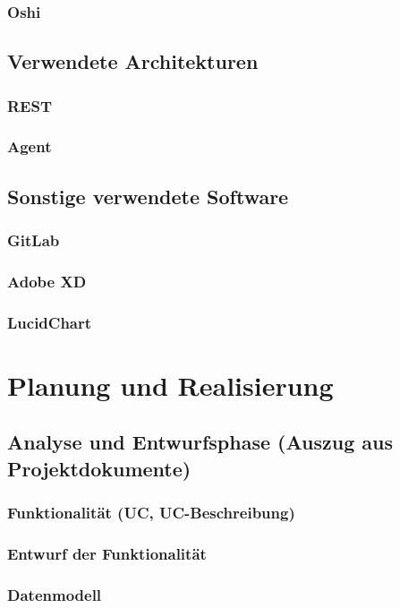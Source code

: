 \documentclass[pdftex,11pt,a4paper,oneside]{book}
\begin{document}
\subsection{Oshi}

\section{Verwendete Architekturen}
\subsection{REST}
\subsection{Agent}
\section{Sonstige verwendete Software}
\subsection{GitLab}
\subsection{Adobe XD}
\subsection{LucidChart}

\chapter{Planung und Realisierung}
\section{Analyse und Entwurfsphase (Auszug aus Projektdokumente)}
\subsection{Funktionalität (UC, UC-Beschreibung)}
\subsection{Entwurf der Funktionalität}
\subsection{Datenmodell}
\end{document}

